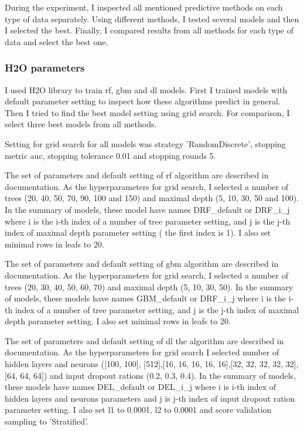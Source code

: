 \documentclass[thesis=M,english]{FITthesis}[2012/10/20]
\begin{document}
During the experiment, I inspected all mentioned predictive methods on each type of data separately. Using different methods, I tested several models and then I selected the best. Finally, I compared results from all methods for each type of data and select the best one. 

\subsubsection{H2O parameters}
I used H2O library to train \gls{rf}, \gls{gbm} and \gls{dl} models. First I trained models with default parameter setting to inspect how these algorithms predict in general. Then I tried to find the best model setting using grid search. For comparison, I select three best models from all methods.

Setting for grid search for all models was strategy 'RandomDiscrete', stopping metric \gls{auc}, stopping tolerance 0.01 and stopping rounds 5.

The set of parameters and default setting of \gls{rf} algorithm are described in documentation\cite{h2o_drf_doc}. As the hyperparameters for grid search, I selected a number of trees (20, 40, 50, 70, 90, 100 and 150) and maximal depth (5, 10, 30, 50 and 100). In the summary of models, these model have names DRF\_default or DRF\_i\_j where i is the i-th index of a number of tree parameter setting, and j is the j-th index of maximal depth parameter setting ( the first index is 1). I also set minimal rows in leafs to 20.

The set of parameters and default setting of \gls{gbm} algorithm are described in documentation\cite{h2o_gbm_doc}. As the hyperparameters for grid search, I selected a number of trees (20, 30, 40, 50, 60, 70) and maximal depth (5, 10, 30, 50). In the summary of models, these models have names GBM\_default or DRF\_i\_j where i is the i-th index of a number of tree parameter setting, and j is the j-th index of maximal depth parameter setting. I also set minimal rows in leafs to 20.

The set of parameters and default setting of \gls{dl} the algorithm are described in documentation\cite{h2o_dl_doc}. As the hyperparameters for grid search I selected number of hidden layers and neurons ([100, 100], [512],[16, 16, 16, 16, 16],[32, 32, 32, 32, 32], [64, 64, 64]) and input dropout rations (0.2, 0.3, 0.4). In the summary of models, these models have names DEL\_default or DEL\_i\_j where i is i-th index of hidden layers and neurons parameters and j is j-th index of input dropout ration parameter setting. I also set l1 to 0.0001, l2 to 0.0001 and score validation sampling to 'Stratified'.
\end{document}
